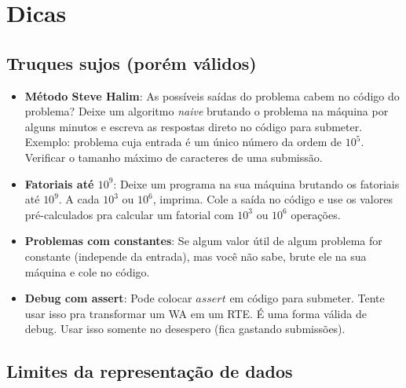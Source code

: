 \chapter{Dicas}

\section{Truques sujos (porém válidos)}

\begin{itemize}
\item \textbf{Método Steve Halim}: As possíveis saídas do problema cabem no código do problema? Deixe um algoritmo \textit{naive} brutando o problema na máquina por alguns minutos e escreva as respostas direto no código para submeter. Exemplo: problema cuja entrada é um único número da ordem de $10^5$. Verificar o tamanho máximo de caracteres de uma submissão.
\item \textbf{Fatoriais até $10^9$}: Deixe um programa na sua máquina brutando os fatoriais até $10^9$. A cada $10^3$ ou $10^6$, imprima. Cole a saída no código e use os valores pré-calculados pra calcular um fatorial com $10^3$ ou $10^6$ operações.
\item \textbf{Problemas com constantes}: Se algum valor útil de algum problema for constante (independe da entrada), mas você não sabe, brute ele na sua máquina e cole no código.
\item \textbf{Debug com assert}: Pode colocar $assert$ em código para submeter. Tente usar isso pra transformar um WA em um RTE. É uma forma válida de debug. Usar isso somente no desespero (fica gastando submissões).
\end{itemize}

\newpage

\section{Limites da representação de dados}

